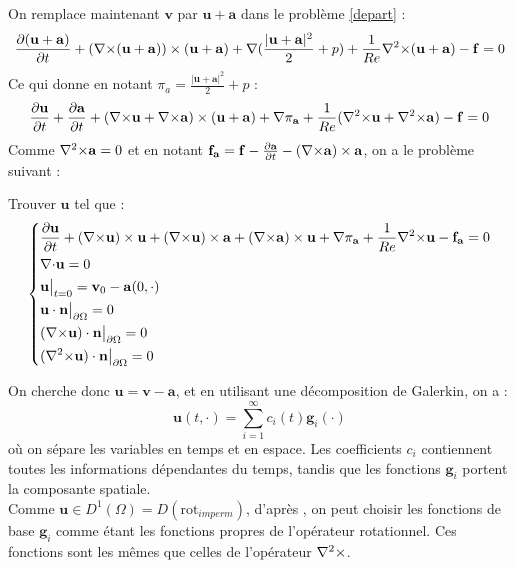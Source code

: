 On remplace maintenant $\mathbf{v}$ par $\mathbf{u}+\mathbf{a}$ dans le problème \ref{depart} :
\[ \frac{\partial(\mathbf{u}+\mathbf{a})}{\partial t}+({\nabla\times}(\mathbf{u}+\mathbf{a}))\times(\mathbf{u}+\mathbf{a}) + {\nabla} (\frac{|\mathbf{u}+\mathbf{a}|^2}{2}+p) + \frac{1}{Re}{\nabla^2\times}(\mathbf{u}+\mathbf{a}) - \mathbf{f} = 0 \]
Ce qui donne en notant $\pi_a=\frac{|\mathbf{u}+\mathbf{a}|^2}{2}+p$ :
\[ \frac{\partial \mathbf{u}}{\partial t}+\frac{\partial \mathbf{a}}{\partial t} + ({\nabla\times} \mathbf{u}+{\nabla\times} \mathbf{a})\times(\mathbf{u}+\mathbf{a}) + {\nabla}\pi_{\mathbf{a}} + \frac{1}{Re}({\nabla^2\times} \mathbf{u}+{\nabla^2\times} \mathbf{a}) - \mathbf{f} = 0 \]
Comme ${\nabla^2\times} \mathbf{a} = 0$ et en notant $\mathbf{f_a}=\mathbf{f}-\frac{\partial \mathbf{a}}{\partial t} - ({\nabla\times} \mathbf{a})\times \mathbf{a}$, on a le problème suivant :
\begin{pb}\label{pbu}
Trouver $\mathbf{u}$ tel que :
\begin{equation*}
\left\{\begin{aligned}
&\frac{\partial \mathbf{u}}{\partial t} + ({\nabla\times} \mathbf{u})\times \mathbf{u} + ({\nabla\times} \mathbf{u})\times \mathbf{a} +({\nabla\times} \mathbf{a})\times \mathbf{u} + {\nabla} \pi_{\mathbf{a}} +\frac{1}{Re}{\nabla^2\times}  \mathbf{u} - \mathbf{f_a} = 0\\
&{\nabla\cdot} \mathbf{u} = 0\\
&\mathbf{u}\big\rvert_{t=0} = \mathbf{v}_0 - \mathbf{a}(0,\cdot)\\
&\mathbf{u}\cdot \mathbf{n}{\big\rvert_{\partial\Omega}} = 0\\
&({\nabla\times} \mathbf{u})\cdot \mathbf{n}{\big\rvert_{\partial\Omega}} = 0\\
&({\nabla^2\times}  \mathbf{u})\cdot \mathbf{n}{\big\rvert_{\partial\Omega}} = 0
\end{aligned}\right.
\end{equation*}\end{pb}

On cherche donc $\mathbf{u}=\mathbf{v}-\mathbf{a}$, et en utilisant une décomposition de Galerkin, on a :
\begin{equation}\label{u}
\mathbf{u}(t,\cdot) = \sum_{i=1}^{\infty} c_i(t)\mathbf{g}_i(\cdot)
\end{equation}
où on sépare les variables en temps et en espace. Les coefficients $c_i$ contiennent toutes les informations dépendantes du temps, tandis que les fonctions $\mathbf{g}_i$ portent la composante spatiale.\\

Comme $\mathbf{u}\in D^1(\Omega)=D(\mathrm{rot}_{imperm})$, d'après \cite{Penel2004}, on peut choisir les fonctions de base
$\mathbf{g}_i$ comme étant les fonctions propres de l'opérateur rotationnel. Ces
fonctions sont les mêmes que celles de l'opérateur ${\nabla^2\times}$.

